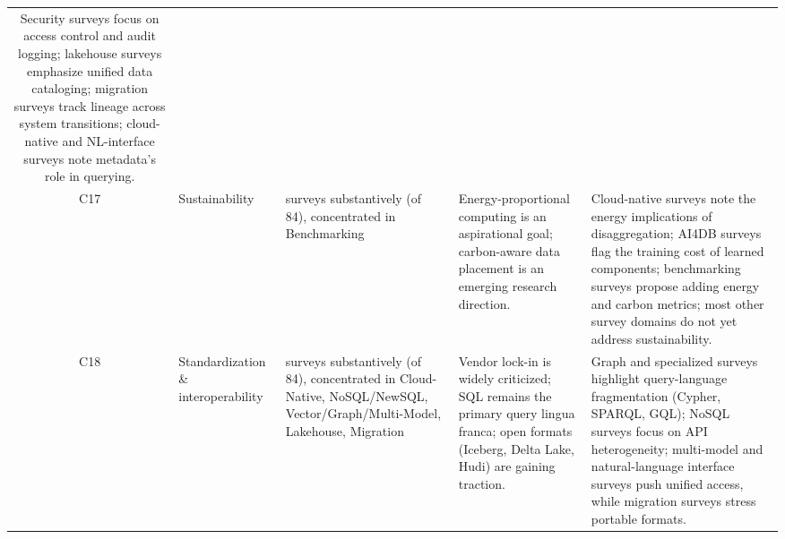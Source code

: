 \documentclass[a4paper,fleqn]{cas-sc}
\begin{document}
\begin{landscape}
\begin{small}
\begin{longtable}{c >{\raggedright\arraybackslash}p{2.2cm} >{\raggedright\arraybackslash}p{2.5cm} >{\raggedright\arraybackslash}p{7.2cm} >{\raggedright\arraybackslash}p{7.2cm}}
Security surveys focus on access control and audit logging; lakehouse surveys emphasize unified data cataloging; migration surveys track lineage across system transitions; cloud-native and NL-interface surveys note metadata's role in querying. \\
\addlinespace
C17 & Sustainability &
6 surveys substantively (of 84), concentrated in Benchmarking &
Energy-proportional computing is an aspirational goal; carbon-aware data placement is an emerging research direction. &
Cloud-native surveys note the energy implications of disaggregation; AI4DB surveys flag the training cost of learned components; benchmarking surveys propose adding energy and carbon metrics; most other survey domains do not yet address sustainability. \\
\addlinespace
C18 & Standardization \& interoperability &
19 surveys substantively (of 84), concentrated in Cloud-Native, NoSQL/NewSQL, Vector/Graph/Multi-Model, Lakehouse, Migration &
Vendor lock-in is widely criticized; SQL remains the primary query lingua franca; open formats (Iceberg, Delta Lake, Hudi) are gaining traction. &
Graph and specialized surveys highlight query-language fragmentation (Cypher, SPARQL, GQL); NoSQL surveys focus on API heterogeneity; multi-model and natural-language interface surveys push unified access, while migration surveys stress portable formats. \\
\end{longtable}
\end{small}
\end{landscape}
\end{document}
